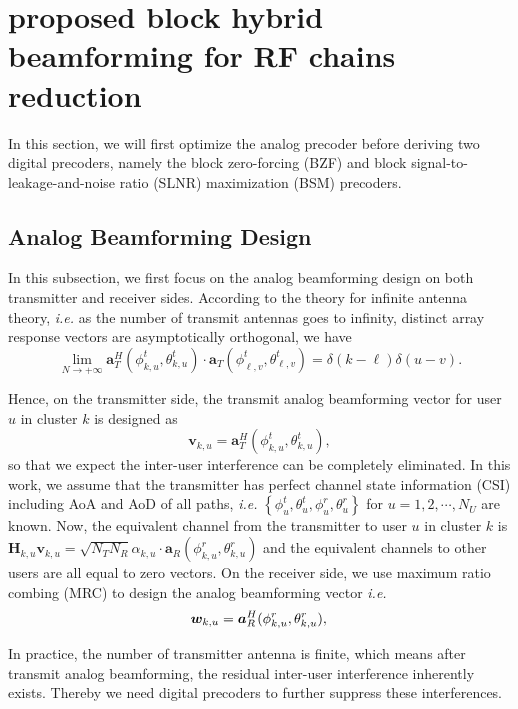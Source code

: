 \documentclass[conference]{IEEEtran}
\begin{document}
{\section{proposed block hybrid beamforming for RF chains reduction}
In this section, we will first optimize the analog precoder before deriving two digital precoders, namely the block zero-forcing (BZF) and block signal-to-leakage-and-noise ratio (SLNR) maximization (BSM) precoders.

\subsection{Analog Beamforming Design}
In this subsection, we first focus on the analog beamforming design on both transmitter and receiver sides. According to the theory for infinite antenna theory, \textit{i.e.} as the number of transmit antennas goes to infinity, distinct array response vectors are asymptotically orthogonal, we have
\begin{equation}\label{Eq:assumption}
\lim_{N\rightarrow +\infty} \bm{a}_{T}^{H}(\phi^t_{k,u},\theta^t_{k,u}) \cdot\bm{a}_{T}(\phi^t_{\ell,v},\theta^t_{\ell,v})=\delta(k-\ell)\delta(u-v).
\end{equation}

Hence, on the transmitter side, the transmit analog beamforming vector for user $u$ in cluster $k$ is designed as
\begin{equation}
\bm{v}_{k,u}=\bm{a}_{T}^{H}(\phi^t_{k,u},\theta^t_{k,u}),
\label{eq:vku}
\end{equation}
so that we expect the inter-user interference can be completely eliminated. In this work, we assume that the transmitter has perfect channel state information (CSI) including AoA and AoD of all paths, {\em i.e.} $\left\{\phi^t_u,\theta^t_u,\phi^r_u,\theta^r_u\right\}$ for $u=1,2,\cdots,N_U$ are known.  Now, the equivalent channel from the transmitter to user $u$ in cluster $k$ is $\bm{H}_{k,u}\bm{v}_{k,u}=\sqrt{N_{T}N_{R}}\alpha_{k,u}\cdot \bm{a}_{R}(\phi^r_{k,u},\theta^r_{k,u})$ and the equivalent channels to other users are all equal to zero vectors. On the receiver side, we use maximum ratio combing (MRC) to design the analog beamforming vector \textit{i.e.}
\begin{equation}
\bm{w}_{k,u}=\bm{a}_{R}^{H}(\phi^r_{k,u},\theta^r_{k,u}),\\
\label{eq:wku}
\end{equation}

In practice, the number of transmitter antenna is finite, which means after transmit analog beamforming, the residual inter-user interference inherently exists. Thereby we need digital precoders to further suppress these interferences.


}
\end{document}
